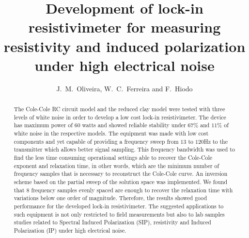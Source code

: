 \documentclass{vie16}
\begin{document}
\title{Development of lock-in resistivimeter for measuring
resistivity and induced polarization under high electrical noise}
\author{J.~M.~Oliveira, W.~C.~Ferreira and F.~Hiodo}
\maketitle


\begin{abstract}

	The Cole-Cole RC circuit model and the reduced clay model were
	tested with three levels of white noise in order to develop a low
	cost lock-in resistivimeter. The device has maximum power of 60
	watts and showed reliable stability under $67 \%$ and $11 \%$ of
	white noise in the respective models. The equipment was made with
	low cost components and yet capable of providing a frequency sweep
	from $13$ to $120$Hz to the transmitter which allows better signal
	sampling. This frequency bandwidth was used to find the less time
	consuming operational settings able to recover the Cole-Cole
	exponent and relaxation time, in other words, which are the minimum
	number of frequency samples that is necessary to reconstruct the
	Cole-Cole curve. An inversion scheme based on the partial sweep of
	the solution space was implemented. We found that $8$
	frequency samples evenly spaced are enough to recover the relaxation
	time with variations below one order of magnitude. Therefore, the
	results showed good performance for the developed lock-in
	resistivimeter. The suggested applications to such equipment is not
	only restricted to field measurements but also to lab samples
	studies related to Spectral Induced Polarization (SIP), resistivity
	and Induced Polarization (IP) under high electrical noise.  
\end{abstract}	
		

\newpage
\end{document}
